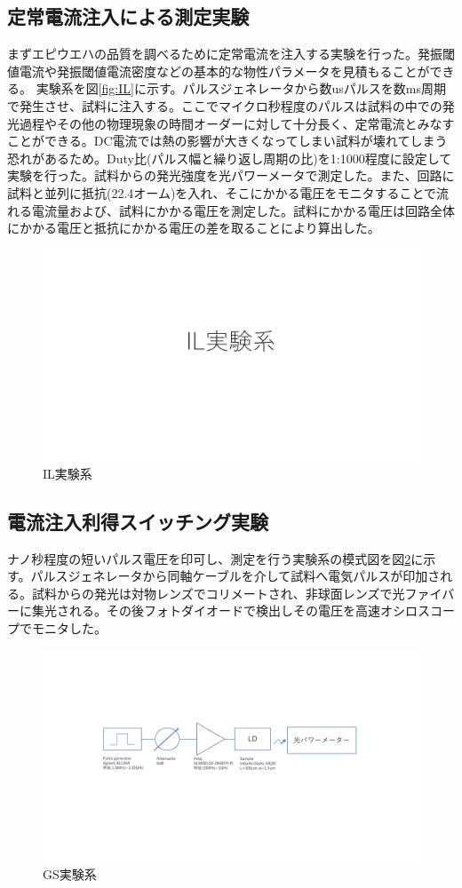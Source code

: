 \subsection{定常電流注入による測定実験}
まずエピウエハの品質を調べるために定常電流を注入する実験を行った。発振閾値電流や発振閾値電流密度などの基本的な物性パラメータを見積もることができる。
実験系を図\ref{fig:IL}に示す。パルスジェネレータから数usパルスを数ms周期で発生させ、試料に注入する。ここでマイクロ秒程度のパルスは試料の中での発光過程やその他の物理現象の時間オーダーに対して十分長く、定常電流とみなすことができる。DC電流では熱の影響が大きくなってしまい試料が壊れてしまう恐れがあるため。Duty比(パルス幅と繰り返し周期の比)を1:1000程度に設定して実験を行った。試料からの発光強度を光パワーメータで測定した。また、回路に試料と並列に抵抗(22.4オーム)を入れ、そこにかかる電圧をモニタすることで流れる電流量および、試料にかかる電圧を測定した。試料にかかる電圧は回路全体にかかる電圧と抵抗にかかる電圧の差を取ることにより算出した。
\begin{figure}[htbp]
	\includegraphics[width=15cm]{figure/fig_IL_setup.pdf}
	\caption{IL実験系}
	\label{fig:IL_setup}
\end{figure}
\subsection{電流注入利得スイッチング実験}
ナノ秒程度の短いパルス電圧を印可し、測定を行う実験系の模式図を図\ref{fig:GS_setup}に示す。パルスジェネレータから同軸ケーブルを介して試料へ電気パルスが印加される。試料からの発光は対物レンズでコリメートされ、非球面レンズで光ファイバーに集光される。その後フォトダイオードで検出しその電圧を高速オシロスコープでモニタした。

\begin{figure}[htbp]
	\includegraphics[width=15cm]{figure/fig_2_3_1_01_GS_setup.pdf}
	\caption{GS実験系}
	\label{fig:GS_setup}
\end{figure}

